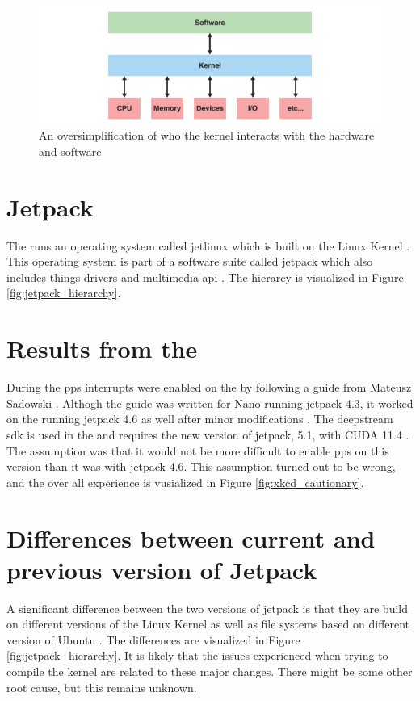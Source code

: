 \begin{figure}[H]
    \centering
    \includegraphics[width=\textwidth]{figures/kernel.pdf}
    \caption{An oversimplification of who the kernel interacts with the hardware and software}
    \label{fig:kernel_visualization}
\end{figure}

\section{Jetpack}
The \jx runs an operating system called \gls{jetlinux} which is built on the Linux Kernel \cite{JetsonLinux352023}.
This operating system is part of a software suite called \gls{jetpack} which also includes things \cuda drivers and multimedia \gls{api} \cite{nvidiaJetPackSDK2023}.
The hierarcy is visualized in Figure \ref{fig:jetpack_hierarchy}.

\section{Results from the \preproject}
During the \preproject \gls{pps} interrupts were enabled on the \jx by following a guide from Mateusz Sadowski \cite{sadowskiEnablingPPSJetson2020} \cite[26]{martensPortableSensorRig2022}.
Althogh the guide was written for \jetson Nano running \gls{jetpack} 4.3, it worked on the \jx running \gls{jetpack} 4.6 as well after minor modifications \cite{sadowskiEnablingPPSJetson2020} \cite[26]{martensPortableSensorRig2022}.
The \gls{deepstream} \gls{sdk} is used in the \master and requires the new version of \gls{jetpack}, 5.1, with CUDA 11.4 \cite{nvidiaDeepStreamSDKGet2019}.
The assumption was that it would not be more difficult to enable \gls{pps} on this version than it was with \gls{jetpack} 4.6.
This assumption turned out to be wrong, and the over all experience is vusialized in Figure \ref{fig:xkcd_cautionary}.

\section{Differences between current and previous version of Jetpack}
A significant difference between the two versions of \gls{jetpack} is that they are build on different versions of the Linux Kernel as well as file systems based on different version of Ubuntu \cite{nvidiaJetPackSDK2022} \cite{nvidiaJetPackSDK2023}.
The differences are visualized in Figure \ref{fig:jetpack_hierarchy}.
It is likely that the issues experienced when trying to compile the kernel are related to these major changes.
There might be some other root cause, but this remains unknown.

